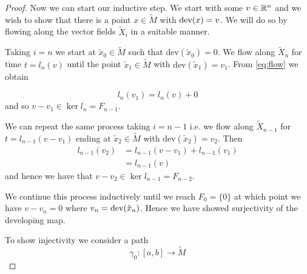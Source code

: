 \begin{proof}
    Now we can start our inductive step. We start with some $v \in \mathbb{R}^n$ and we
    wish to show that there is a point $x \in \tilde{M}$ with $\text{dev}(x) = v$. We
    will do so by flowing along the vector fields $\tilde{X}_i$ in a suitable
    manner.

    Taking $i=n$ we start at $\tilde{x}_0 \in \tilde{M}$ such that
    $\text{dev}(\tilde{x}_0) = 0$. We flow along $\tilde{X}_n$ for time $t=l_n(v)$
    until the point $\tilde{x}_1 \in \tilde{M}$ with $\text{dev}(\tilde{x}_1) =
        v_1$. From \eqref{eq:flow} we obtain

    \[l_n(v_1) = l_n(v) + 0\]
    and so $v- v_1 \in \ker l_n = F_{n-1}$.

    We can repeat the same process taking $i=n-1$ i.e. we flow along
    $\tilde{X}_{n-1}$ for $t=l_{n-1}(v-v_1)$ ending at $\tilde{x}_2 \in \tilde{M}$
    with $\text{dev}(\tilde{x}_2) = v_2$. Then
    \begin{align*}
        l_{n-1}(v_2) & = l_{n-1}(v-v_1) + l_{n-1}(v_1) \\
                     & = l_{n-1}(v)
    \end{align*}
    and hence we have that $v-v_2 \in \ker l_{n-1} = F_{n-2}$.

    We continue this process inductively until we reach $F_0 = \{0\}$ at which
    point we have $v-v_n = 0$ where $v_n = \text{dev}(\tilde{x}_n)$. Hence we have showed
    surjectivity of the developing map.

    To show injectivity we consider a path
    \[\gamma_0 : [a,b] \to \tilde{M}\]


\end{proof}
